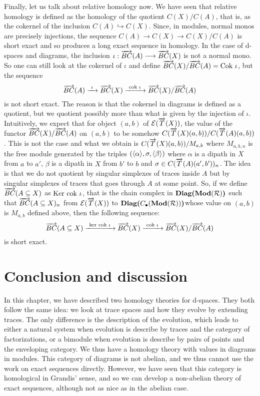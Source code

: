 	Finally, let us talk about relative homology now. We have seen that relative homology is defined as the homology of the quotient $C(X)/C(A)$, that is, as the cokernel of the inclusion $C(A) \hookrightarrow C(X)$. Since, in modules, normal monos are precisely injections, the sequence $C(A) \rightarrow C(X) \rightarrow C(X)/C(A)$ is short exact and so produces a long exact sequence in homology.
	In the case of d-spaces and diagrams, the inclusion $\iota : \overrightarrow{BC}(A) \longrightarrow \overrightarrow{BC}(X)$ is not a normal mono. So one can still look at the cokernel of $\iota$ and define $\overrightarrow{BC}(X)/\overrightarrow{BC}(A) = \text{Cok }\iota$, but the sequence
	$$\overrightarrow{BC}(A) \xrightarrow{~\iota~} \overrightarrow{BC}(X) \xrightarrow{~\text{cok }\iota~} \overrightarrow{BC}(X)/\overrightarrow{BC}(A)$$
	is not short exact. The reason is that the cokernel in diagrams is defined as a quotient, but we quotient possibly more than what is given by the injection of $\iota$. Intuitively, we expect that for object $(a,b)$ of $\mathcal{E}(\overrightarrow{T}(X))$, the value of the functor $\overrightarrow{BC}(X)/\overrightarrow{BC}(A)$ on $(a,b)$ to be somehow $C(\overrightarrow{T}(X)(a,b))/C(\overrightarrow{T}(A)(a,b))$. This is not the case and what we obtain is $C(\overrightarrow{T}(X)(a,b))/M_{a,b}$ where $M_{a,b,n}$ is the free module generated by the triples $(\langle\alpha\rangle,\sigma,\langle\beta\rangle)$ where $\alpha$ is a dipath in $X$ from $a$ to $a'$, $\beta$ is a dipath in $X$ from $b'$ to $b$ and $\sigma \in C(\overrightarrow{T}(A)(a',b'))_n$. The idea is that we do not quotient by singular simplexes of traces inside $A$ but by singular simplexes of traces that goes through $A$ at some point. So, if we define $\overrightarrow{BC}(A \subseteq X)$ as $\text{Ker }\text{cok }\iota$, that is the chain complex in $\textbf{Diag(}\textbf{Mod}(\mathcal{R})\textbf{)}$ such that $\overrightarrow{BC}(A \subseteq X)_n$ from $\mathcal{E}(\overrightarrow{T}(X))$ to $\textbf{Diag(}C_{\bullet}(\textbf{Mod}(\mathcal{R}))\textbf{)}$whose value on $(a,b)$ is $M_{a,b}$ defined above, then the following sequence:
	$$\overrightarrow{BC}(A \subseteq X) \xrightarrow{~\text{ker }\text{cok }\iota~} \overrightarrow{BC}(X) \xrightarrow{~\text{cok }\iota~} \overrightarrow{BC}(X)/\overrightarrow{BC}(A)$$
	is short exact.
	
	
\section*{Conclusion and discussion}
	
	In this chapter, we have described two homology theories for d-spaces. They both follow the same idea: we look at trace spaces and how they evolve by extending traces. The only difference is the description of the evolution, which leads to either a natural system when evolution is describe by traces and the category of factorizations, or a bimodule when evolution is describe by pairs of points and the enveloping category. We thus have a homology theory with values in diagrams in modules. This category of diagrams is not abelian, and we thus cannot use the work on exact sequences directly. However, we have seen that this category is homological in Grandis' sense, and so we can develop a non-abelian theory of exact sequences, although not as nice as in the abelian case.
	

